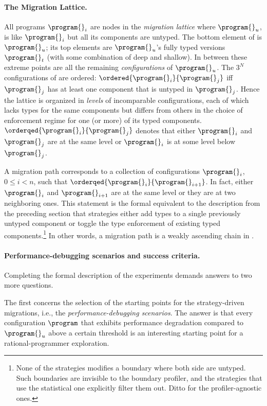 \paragraph{The Migration Lattice.}  All programs $\program{}_i$ are nodes in the
\emph{migration lattice}  where ${\program{}_u}$, is like
${\program{}_i}$ but all its components are untyped. The bottom element of
 is ${\program{}_u}$; its top elements are
${\program{}_u}$'s fully typed versions $\program{}_t$ (with some combination of
deep and shallow). In between these extreme points are all the remaining
\emph{configurations} of $\program{}_u$. The $3^N$ configurations of
 are ordered: $\ordered{\program{}_i}{\program{}_j}$ iff
$\program{}_j$ has at least one component that is untyped in
$\program{}_j$. Hence the lattice is organized in \emph{levels} of incomparable
configurations, each of which lacks types for the same components but differs
from others in the choice of enforcement regime for one (or more) of its typed
components.  $\orderqed{\program{}_i}{\program{}_j}$ denotes that either
$\program{}_i$ and $\program{}_j$ are at the same level or $\program{}_i$ is at
some level below $\program{}_j$.

A migration path corresponds to a collection of configurations $\program{}_i$,
$0 \leq i < n$, such that $\orderqed{\program{}_i}{\program{}_{i+1}}$. In fact,
either $\program{}_i$ and $\program{}_{i+1}$ are at the same level or they are
at two neighboring ones.  This statement is the formal equivalent to the
description from the preceding section that strategies either add types to a
single previously untyped component or toggle the type enforcement of existing
typed components.\footnote{None of the strategies modifies a boundary where both
side are untyped. Such boundaries are invisible to the boundary
profiler, and the strategies that use the statistical one explicitly filter them
out. Ditto for the profiler-agnostic ones.}  In other words, a migration path is
a weakly ascending chain in
.


\paragraph{Performance-debugging scenarios and success criteria.} Completing the
formal description of the experiments demands answers to two more questions.

The first concerns the selection of the starting points for the
strategy-driven migrations,
i.e., the \emph{performance-debugging scenarios}.  The
answer is that every configuration $\program$ that exhibits performance
degradation compared to $\program{}_u$ above a certain threshold is an
interesting starting point for a rational-programmer exploration.


